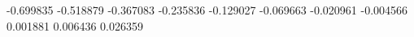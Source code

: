 -0.699835
-0.518879
-0.367083
-0.235836
-0.129027
-0.069663
-0.020961
-0.004566
0.001881
0.006436
0.026359
